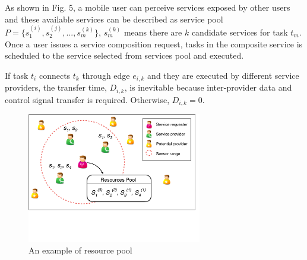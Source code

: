 \documentclass[journal]{IEEEtran}
\begin{document}
As shown in Fig. 5, a mobile user can perceive services exposed by other users and these available services can be described as service pool $P = \{s_1^{(i)}, s_2^{(j)}, ..., s_m^{(k)} \}$, $s_m^{(k)}$ means there are $k$ candidate services for task $t_m$. Once a user issues a service composition request, tasks in the composite service is scheduled to the service selected from services pool and executed. 

If task $t_i$ connects $t_k$ through edge $e_{i,k}$ and they are executed by different service providers, the transfer time, $D_{i,k}$, is inevitable because inter-provider data and control signal transfer is required. Otherwise, $D_{i,k} = 0$.


\begin{figure}[!t]
\centering
\includegraphics[width=3in]{./img/pic-extra.pdf}
\caption{An example of resource pool}
\label{Resource Pool}
\end{figure}

\end{document}
